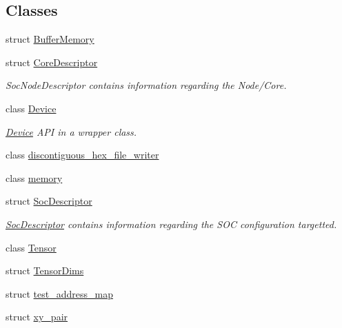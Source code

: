 \subsection*{Classes}
\begin{DoxyCompactItemize}
\item 
struct \hyperlink{structllk_1_1BufferMemory}{Buffer\+Memory}
\item 
struct \hyperlink{structllk_1_1CoreDescriptor}{Core\+Descriptor}
\begin{DoxyCompactList}\small\item\em Soc\+Node\+Descriptor contains information regarding the Node/\+Core. \end{DoxyCompactList}\item 
class \hyperlink{classllk_1_1Device}{Device}
\begin{DoxyCompactList}\small\item\em \hyperlink{classllk_1_1Device}{Device} A\+PI in a wrapper class. \end{DoxyCompactList}\item 
class \hyperlink{classllk_1_1discontiguous__hex__file__writer}{discontiguous\+\_\+hex\+\_\+file\+\_\+writer}
\item 
class \hyperlink{classllk_1_1memory}{memory}
\item 
struct \hyperlink{structllk_1_1SocDescriptor}{Soc\+Descriptor}
\begin{DoxyCompactList}\small\item\em \hyperlink{structllk_1_1SocDescriptor}{Soc\+Descriptor} contains information regarding the S\+OC configuration targetted. \end{DoxyCompactList}\item 
class \hyperlink{classllk_1_1Tensor}{Tensor}
\item 
struct \hyperlink{structllk_1_1TensorDims}{Tensor\+Dims}
\item 
struct \hyperlink{structllk_1_1test__address__map}{test\+\_\+address\+\_\+map}
\item 
struct \hyperlink{structllk_1_1xy__pair}{xy\+\_\+pair}
\end{DoxyCompactItemize}
